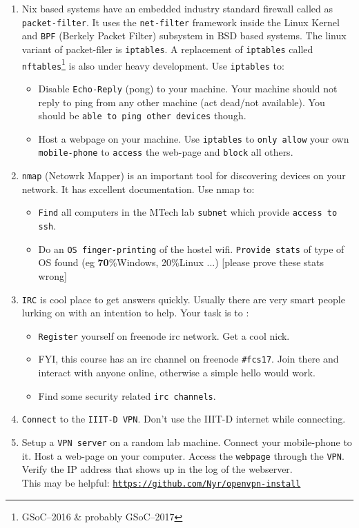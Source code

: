\documentclass[11pt]{article}
\begin{document}
\begin{enumerate}
	\item {
			Nix based systems have an embedded industry standard firewall called as \texttt{packet-filter}. It uses the \texttt{net-filter} framework inside the Linux Kernel and \texttt{BPF} (Berkely Packet Filter) subsystem in BSD based systems. The linux variant of packet-filer is \texttt{iptables}. A replacement of \texttt{iptables} called \texttt{nftables}\footnote{GSoC--2016 \& probably GSoC--2017} is also under heavy development. Use \texttt{iptables} to:
		    \begin{itemize}
			    \item Disable \texttt{Echo-Reply} (pong) to your machine. Your machine should not reply to ping from any other machine (act dead/not available). You should be \texttt{able to ping other devices} though.
			    \item Host a webpage on your machine. Use \texttt{iptables} to \texttt{only allow} your own \texttt{mobile-phone} to \texttt{access} the web-page and \texttt{block} all others.
		    \end{itemize}
		}
	\item {
			\texttt{nmap} (Netowrk Mapper) is an important tool for discovering devices on your network. It has excellent documentation. Use nmap to:
		\begin{itemize}
			\item \texttt{Find} all computers in the MTech lab \texttt{subnet} which provide \texttt{access to ssh}.
			\item Do an \texttt{OS finger-printing} of the hostel wifi. \texttt{Provide stats} of type of OS found (eg \textbf{70}\%Windows, 20\%Linux ...) [please prove these stats wrong]
		\end{itemize}
		}
	\item  { 
		\texttt{IRC} is cool place to get answers quickly. Usually there are very smart people lurking on with an intention to help. Your task is to :
		\begin{itemize}
			\item \texttt{Register} yourself on freenode irc network. Get a cool nick.
			\item FYI, this course has an irc channel on freenode \texttt{\#fcs17}. Join there and interact with anyone online, otherwise a simple hello would work.
			\item Find some security related \texttt{irc channels}.
		\end{itemize}
	}
	\item {
			\texttt{Connect} to the \texttt{IIIT-D VPN}. Don't use the IIIT-D internet while connecting.
			}
	\item {
			Setup a \texttt{VPN server} on a random lab machine. Connect your mobile-phone to it. Host a web-page on your computer. Access the \texttt{webpage} through the \texttt{VPN}. Verify the IP address that shows up in the log of the webserver. \\
			This may be helpful: \href{https://github.com/Nyr/openvpn-install}{\texttt{https://github.com/Nyr/openvpn-install}}
			}
	    
\end{enumerate}
\end{document}

